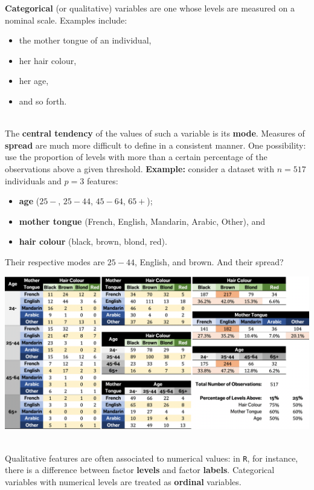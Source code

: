 \documentclass[20pt,landscape,footrule,headrule]{foils}
\newcommand{\newl}{\newline\newline}
\begin{document}
{{\noindent \textbf{Categorical} (or  qualitative) variables are one whose levels are measured on a nominal scale. 
\newl 
Examples include: 
\begin{itemize}
\item the mother tongue of an individual,
\item her hair colour,
\item her age, 
\item and so forth.  
\end{itemize}
\newpage\ \\ \noindent The \textbf{central tendency} of the values of such a variable is its \textbf{mode}. 
\newl Measures of \textbf{spread} are much more difficult to define in a consistent manner. One possibility: use the proportion of levels with more than a certain percentage of the observations above a given threshold.
\newl \textbf{Example:} consider a dataset with  $n=517$ individuals and $p=3$ features:
\begin{itemize}
\item \textbf{age} ($25-$, $25-44$, $45-64$, $65+$);
\item \textbf{mother tongue} (French, English, Mandarin, Arabic, Other), and 
\item \textbf{hair colour} (black, brown, blond, red).
\end{itemize}
Their respective modes are $25-44$, English, and brown. And their spread? 
\newpage\ 
\begin{center}
\includegraphics[width=\textwidth]{Images/Categorical.png}
\end{center}
\newpage\ \\ \noindent 
Qualitative features are often associated to numerical values: in \texttt{R}, for instance, there is a difference between factor \textbf{levels} and factor \textbf{labels}. 
\newl Categorical variables with numerical levels are treated as \textbf{ordinal} variables. 
}}
\end{document}
